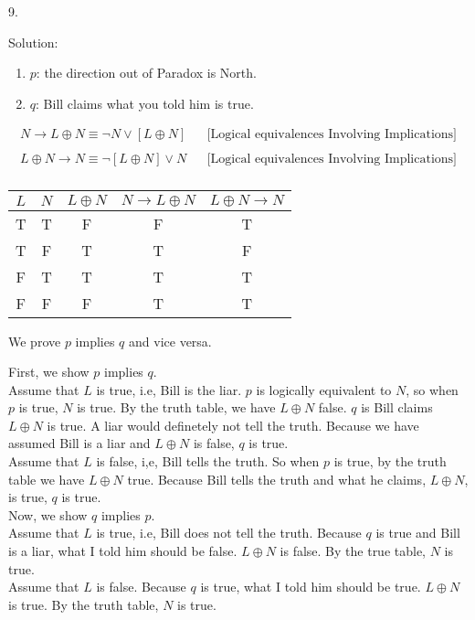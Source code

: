 \documentclass[12pt]{article}
\begin{document}
9. 

\indent Solution:\\
\begin{enumerate}
    \item \label{NisDir} $p$: the direction out of Paradox is North.
    \item \label{BsaysItrue} $q$: Bill claims what you told him is true.
\end{enumerate}
\begin{align*}
N \to L \oplus N \equiv \lnot N \lor [L \oplus N] && \text{[Logical equivalences Involving Implications]}\\ 
\end{align*}
\begin{align*}
L \oplus N \to N \equiv \lnot [L \oplus N] \lor N &&  \text{[Logical equivalences Involving Implications]} \\
\end{align*}

\begin{center}
\begin{tabular}{c|c|c|c|c}
    $L$ & $N$ & $L \oplus N$ & $N \to L \oplus N$ & $L \oplus N \to N$ \\
\hline
T & T & F & F & T \\
T & F & T & T & F \\
F & T & T & T & T \\
F & F & F & T & T
\end{tabular}
\end{center}

We prove $p$ implies $q$ and vice versa.
 
First, we show $p$ implies $q$. \\
\indent Assume that $L$ is true, i.e, Bill is the liar. $p$ is logically equivalent to $N$, so when $p$ is true, $N$ is true. By the truth table, we have $L \oplus N$ false. $q$ is Bill claims $L \oplus N$ is true. A liar would definetely not tell the truth. Because we have assumed Bill is a liar and $L \oplus N$ is false, $q$ is true. \\
\indent Assume that $L$ is false, i,e, Bill tells the truth. So when $p$ is true, by the truth table we have $L \oplus N$ true. Because Bill tells the truth and what he claims, $L \oplus N$, is true, $q$ is true.\\
\indent Now, we show $q$ implies $p$.\\
\indent Assume that $L$ is true, i.e, Bill does not tell the truth. Because $q$ is true and Bill is a liar, what I told him should be false. $L \oplus N$ is false. By the true table, $N$ is true.\\
\indent Assume that $L$ is false. Because $q$ is true, what I told him should be true. $L \oplus N$ is true. By the truth table, $N$ is true.\\
\end{document}
